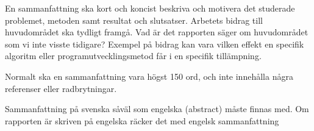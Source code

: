 En sammanfattning ska kort och koncist beskriva och motivera det studerade problemet,
metoden samt resultat och slutsatser. Arbetets bidrag till huvudområdet ska tydligt framgå.
Vad är det rapporten säger om huvudområdet som vi inte visste tidigare? Exempel på
bidrag kan vara vilken effekt en specifik algoritm eller programutvecklingsmetod får i en
specifik tillämpning.

Normalt ska en sammanfattning vara högst 150 ord, och inte innehålla några referenser
eller radbrytningar.

Sammanfattning på svenska såväl som engelska (abstract) måste finnas med. Om
rapporten är skriven på engelska räcker det med engelsk sammanfattning 